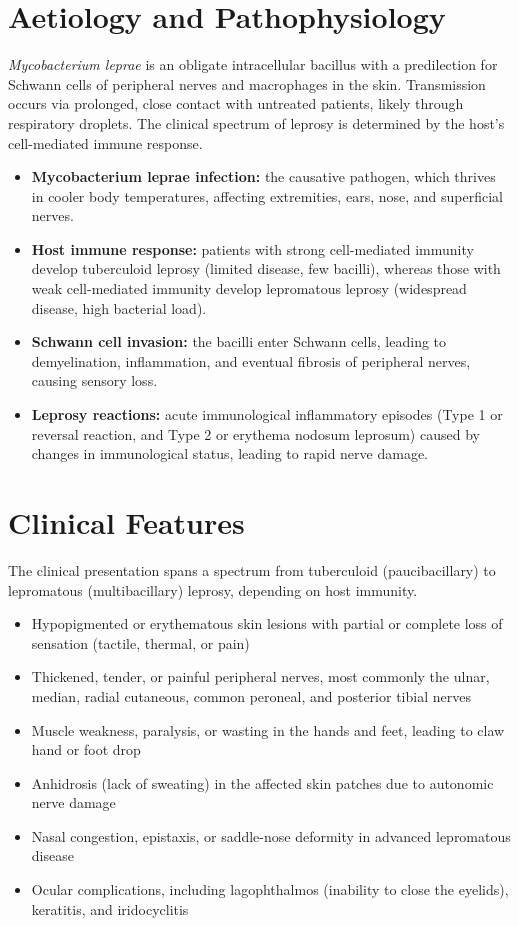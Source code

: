 \section*{Aetiology and Pathophysiology}
\textit{Mycobacterium leprae} is an obligate intracellular bacillus with a predilection for Schwann cells of peripheral nerves and macrophages in the skin. Transmission occurs via prolonged, close contact with untreated patients, likely through respiratory droplets. The clinical spectrum of leprosy is determined by the host's cell-mediated immune response.
\begin{itemize}
    \item \textbf{Mycobacterium leprae infection:} the causative pathogen, which thrives in cooler body temperatures, affecting extremities, ears, nose, and superficial nerves.
    \item \textbf{Host immune response:} patients with strong cell-mediated immunity develop tuberculoid leprosy (limited disease, few bacilli), whereas those with weak cell-mediated immunity develop lepromatous leprosy (widespread disease, high bacterial load).
    \item \textbf{Schwann cell invasion:} the bacilli enter Schwann cells, leading to demyelination, inflammation, and eventual fibrosis of peripheral nerves, causing sensory loss.
    \item \textbf{Leprosy reactions:} acute immunological inflammatory episodes (Type 1 or reversal reaction, and Type 2 or erythema nodosum leprosum) caused by changes in immunological status, leading to rapid nerve damage.
\end{itemize}

\section*{Clinical Features}
The clinical presentation spans a spectrum from tuberculoid (paucibacillary) to lepromatous (multibacillary) leprosy, depending on host immunity.
\begin{itemize}
    \item Hypopigmented or erythematous skin lesions with partial or complete loss of sensation (tactile, thermal, or pain)
    \item Thickened, tender, or painful peripheral nerves, most commonly the ulnar, median, radial cutaneous, common peroneal, and posterior tibial nerves
    \item Muscle weakness, paralysis, or wasting in the hands and feet, leading to claw hand or foot drop
    \item Anhidrosis (lack of sweating) in the affected skin patches due to autonomic nerve damage
    \item Nasal congestion, epistaxis, or saddle-nose deformity in advanced lepromatous disease
    \item Ocular complications, including lagophthalmos (inability to close the eyelids), keratitis, and iridocyclitis
\end{itemize}

